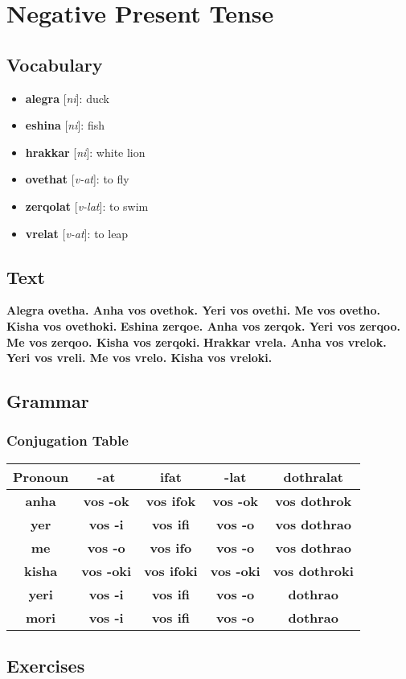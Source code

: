 \chapter{Negative Present Tense}
\section*{Vocabulary}
\begin{itemize}
	\item \textbf{alegra} [\textit{ni}]: duck
	\item \textbf{eshina} [\textit{ni}]: fish
	\item \textbf{hrakkar} [\textit{ni}]: white lion
	\item \textbf{ovethat} [\textit{v-at}]: to fly
	\item \textbf{zerqolat} [\textit{v-lat}]: to swim
	\item \textbf{vrelat} [\textit{v-at}]: to leap
\end{itemize}
\section*{Text}
\textbf{Alegra ovetha. Anha vos ovethok. Yeri vos ovethi. Me vos ovetho. Kisha vos ovethoki.}
\textbf{Eshina zerqoe. Anha vos zerqok. Yeri vos zerqoo. Me vos zerqoo. Kisha vos zerqoki.}
\textbf{Hrakkar vrela. Anha vos vrelok. Yeri vos vreli. Me vos vrelo. Kisha vos vreloki.}
\section*{Grammar}
\subsection*{Conjugation Table}
\begin{tabular}{|c|c|c|c|c|}
		\hline
		Pronoun & \textbf{-at} & \textbf{ifat} & \textbf{-lat} & \textbf{dothralat} \\
		\hline
		\textbf{anha} & \textbf{vos -ok} & \textbf{vos ifok} & \textbf{vos -ok} & \textbf{vos dothrok} \\
		\hline
		\textbf{yer} & \textbf{vos -i} & \textbf{vos ifi} & \textbf{vos -o} & \textbf{vos dothrao} \\
		\hline
		\textbf{me} & \textbf{vos -o} & \textbf{vos ifo} & \textbf{vos -o} & \textbf{vos dothrao} \\
		\hline
		\textbf{kisha} & \textbf{vos -oki} & \textbf{vos ifoki} & \textbf{vos -oki} & \textbf{vos dothroki} \\
		\hline
		\textbf{yeri} & \textbf{vos -i} & \textbf{vos ifi} & \textbf{vos -o} & \textbf{dothrao} \\
		\hline
		\textbf{mori} & \textbf{vos -i} & \textbf{vos ifi} & \textbf{vos -o} & \textbf{dothrao} \\
		\hline
\end{tabular}
\section*{Exercises}
